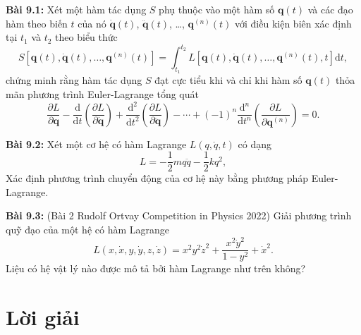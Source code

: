 \textbf{Bài 9.1:} Xét một hàm tác dụng \(S\) phụ thuộc vào một hàm số \(\mathbf{q}(t)\) và các đạo hàm theo biến \(t\) của nó \(\mathbf{\dot{q}}(t)\), \(\mathbf{\ddot{q}}(t)\), \ldots, \(\mathbf{q}^{(n)} (t)\) với điều kiện biên xác định tại \(t_1\) và \(t_2\) theo biểu thức
\begin{equation}
    S \left[\mathbf{q}(t), \mathbf{\dot{q}}(t), \ldots, \mathbf{q}^{(n)} (t)\right] = \int_{t_1}^{t_2} L\left[ \mathbf{q}(t), \mathbf{\dot{q}}(t), \ldots, \mathbf{q}^{(n)} (t), t \right] \mathrm{d}t,
\end{equation}
chứng minh rằng hàm tác dụng \(S\) đạt cực tiểu khi và chỉ khi hàm số \(\mathbf{q}(t)\) thỏa mãn phương trình Euler-Lagrange tổng quát
\begin{equation}
    \frac{\partial L}{\partial \mathbf{q}} - \frac{\mathrm{d}}{\mathrm{d}t} \left( \frac{\partial L}{\partial \mathbf{\dot{q}}} \right) + \dfrac{\mathrm{d}^2}{\mathrm{d} t^2} \left( \dfrac{\partial L}{\partial \mathbf{\ddot{q}}}\right) - \cdots + (-1)^n \frac{\mathrm{d}^n}{\mathrm{d}t^n} \left( \frac{\partial L}{\partial \mathbf{q}^{(n)}} \right) = 0.
\end{equation}

\textbf{Bài 9.2:} Xét một cơ hệ có hàm Lagrange \(L ( q, \ddot{q}, t)\) có dạng
\begin{equation}
    L = -\dfrac{1}{2} m q \ddot{q} - \dfrac{1}{2} k q^2,
\end{equation}
Xác định phương trình chuyển động của cơ hệ này bằng phương pháp Euler-Lagrange.

\textbf{Bài 9.3:} (Bài 2 Rudolf Ortvay Competition in Physics 2022) Giải phương trình quỹ đạo của một hệ có hàm Lagrange
\begin{equation}
    L (x, \dot{x}, y, \dot{y}, z, \dot{z}) = x^2 y^2 \dot{z}^2 + \dfrac{x^2 \dot{y}^2}{1-y^2} + \dot{x}^2.
\end{equation}
Liệu có hệ vật lý nào được mô tả bởi hàm Lagrange như trên không?

\section{Lời giải}


\begin{refsection}
\nocite{cline2017variational,morin2008introduction,kompaneyets2013theoretical,dao2002cohocgiaitich}
\printbibliography
\end{refsection}